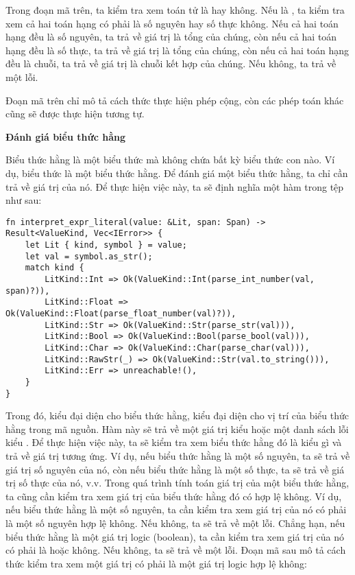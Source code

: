     Trong đoạn mã trên, ta kiểm tra xem toán tử là \kw{+} hay không. Nếu là \kw{+}, ta kiểm tra xem cả hai toán hạng có phải là số nguyên hay số thực không. Nếu cả hai toán hạng đều là số nguyên, ta trả về giá trị là tổng của chúng, còn nếu cả hai toán hạng đều là số thực, ta trả về giá trị là tổng của chúng, còn nếu cả hai toán hạng đều là chuỗi, ta trả về giá trị là chuỗi kết hợp của chúng. Nếu không, ta trả về một lỗi. 

    Đoạn mã trên chỉ mô tả cách thức thực hiện phép cộng, còn các phép toán khác cũng sẽ được thực hiện tương tự.

\noindent \textbf{Đánh giá biểu thức hằng}

    Biểu thức hằng là một biểu thức mà không chứa bất kỳ biểu thức con nào. Ví dụ, biểu thức  là một biểu thức hằng. Để đánh giá một biểu thức hằng, ta chỉ cần trả về giá trị của nó. Để thực hiện việc này, ta sẽ định nghĩa một hàm  trong tệp  như sau:

\begin{lstlisting}[]
fn interpret_expr_literal(value: &Lit, span: Span) -> Result<ValueKind, Vec<IError>> {
    let Lit { kind, symbol } = value;
    let val = symbol.as_str();
    match kind {
        LitKind::Int => Ok(ValueKind::Int(parse_int_number(val, span)?)),
        LitKind::Float => Ok(ValueKind::Float(parse_float_number(val)?)),
        LitKind::Str => Ok(ValueKind::Str(parse_str(val))),
        LitKind::Bool => Ok(ValueKind::Bool(parse_bool(val))),
        LitKind::Char => Ok(ValueKind::Char(parse_char(val))),
        LitKind::RawStr(_) => Ok(ValueKind::Str(val.to_string())),
        LitKind::Err => unreachable!(),
    }
}
\end{lstlisting}

    Trong đó,  kiểu  đại diện cho biểu thức hằng,  kiểu  đại diện cho vị trí của biểu thức hằng trong mã nguồn. Hàm này sẽ trả về một giá trị kiểu  hoặc một danh sách lỗi kiểu . Để thực hiện việc này, ta sẽ kiểm tra xem biểu thức hằng đó là kiểu gì và trả về giá trị tương ứng. Ví dụ, nếu biểu thức hằng là một số nguyên, ta sẽ trả về giá trị số nguyên của nó, còn nếu biểu thức hằng là một số thực, ta sẽ trả về giá trị số thực của nó, v.v. Trong quá trình tính toán giá trị của một biểu thức hằng, ta cũng cần kiểm tra xem giá trị của biểu thức hằng đó có hợp lệ không. Ví dụ, nếu biểu thức hằng là một số nguyên, ta cần kiểm tra xem giá trị của nó có phải là một số nguyên hợp lệ không. Nếu không, ta sẽ trả về một lỗi. Chẳng hạn, nếu biểu thức hằng là một giá trị logic (boolean), ta cần kiểm tra xem giá trị của nó có phải là  hoặc  không. Nếu không, ta sẽ trả về một lỗi. Đoạn mã sau mô tả cách thức kiểm tra xem một giá trị có phải là một giá trị logic hợp lệ không:

